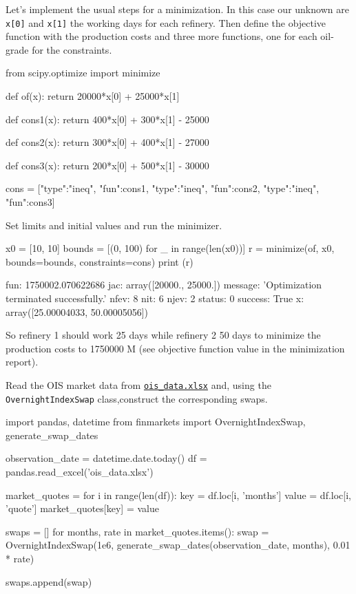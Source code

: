 \cprotEnv\begin{solution}
Let's implement the usual steps for a minimization. In this case our unknown are \texttt{x[0]} and \texttt{x[1]} the working days for each refinery. Then define the objective function with the production costs and three more functions, one for each oil-grade for the constraints.

\begin{ipython}
from scipy.optimize import minimize

def of(x):
    return 20000*x[0] + 25000*x[1]

def cons1(x):
    return 400*x[0] + 300*x[1] - 25000

def cons2(x):
    return 300*x[0] + 400*x[1] - 27000

def cons3(x):
    return 200*x[0] + 500*x[1] - 30000

cons = [{"type":"ineq", "fun":cons1},
        {"type":"ineq", "fun":cons2},
        {"type":"ineq", "fun":cons3}]
\end{ipython}
Set limits and initial values and run the minimizer.
\begin{ipython}
x0 = [10, 10]
bounds = [(0, 100) for _ in range(len(x0))]
r = minimize(of, x0, bounds=bounds, constraints=cons)
print (r)
\end{ipython}
\begin{ioutput}
     fun: 1750002.070622686
     jac: array([20000., 25000.])
 message: 'Optimization terminated successfully.'
    nfev: 8
     nit: 6
    njev: 2
  status: 0
 success: True
       x: array([25.00004033, 50.00005056])
\end{ioutput}    
So refinery 1 should work 25 days while refinery 2 50 days to minimize the production costs to 1750000 M (see objective function value in the minimization report).
\end{solution}

\begin{question}
Read the OIS market data from \href{https://drive.google.com/file/d/1LCEDmheKqwPXFpJ25hFz32QI5im2UJO1/view?usp=sharing}{\texttt{ois\_data.xlsx}} and, using the \texttt{OvernightIndexSwap} class,construct the corresponding swaps.
\end{question}

\cprotEnv\begin{solution}

\begin{ipython}
import pandas, datetime
from finmarkets import OvernightIndexSwap, generate_swap_dates

observation_date = datetime.date.today()
df = pandas.read_excel('ois_data.xlsx')

market_quotes = {}
for i in range(len(df)):
    key = df.loc[i, 'months']
    value = df.loc[i, 'quote']
    market_quotes[key] = value

swaps = []
for months, rate in market_quotes.items():
    swap = OvernightIndexSwap(1e6,
        generate_swap_dates(observation_date, months),
        0.01 * rate)

swaps.append(swap)
\end{ipython}
\end{solution}

